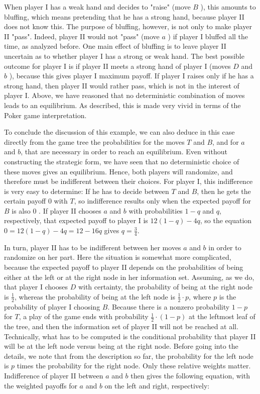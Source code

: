 \documentclass[12pt]{article}
\begin{document}
When player I has a weak hand and decides to "raise" (move $B$ ), this amounts to bluffing, which means pretending that he has a strong hand, because player II does not know this. The purpose of bluffing, however, is not only to make player II "pass". Indeed, player II would not "pass" (move $a$ ) if player I bluffed all the time, as analyzed before. One main effect of bluffing is to leave player II uncertain as to whether player I has a strong or weak hand. The best possible outcome for player I is if player II meets a strong hand of player I (moves $D$ and $b$ ), because this gives player I maximum payoff. If player I raises only if he has a strong hand, then player II would rather pass, which is not in the interest of player I. Above, we have reasoned that no deterministic combination of moves leads to an equilibrium. As described, this is made very vivid in terms of the Poker game interpretation.

To conclude the discussion of this example, we can also deduce in this case directly from the game tree the probabilities for the moves $T$ and $B$, and for $a$ and $b$, that are necessary in order to reach an equilibrium. Even without constructing the strategic form, we have seen that no deterministic choice of these moves gives an equilibrium. Hence, both players will randomize, and therefore must be indifferent between their choices. For player I, this indifference is very easy to determine: If he has to decide between $T$ and $B$, then he gets the certain payoff 0 with $T$, so indifference results only when the expected payoff for $B$ is also 0 . If player II chooses $a$ and $b$ with probabilities $1-q$ and $q$, respectively, that expected payoff to player I is $12(1-q)-4 q$, so the equation $0=12(1-q)-4 q=12-16 q$ gives $q=\frac{3}{4}$.

In turn, player II has to be indifferent between her moves $a$ and $b$ in order to randomize on her part. Here the situation is somewhat more complicated, because the expected payoff to player II depends on the probabilities of being either at the left or at the right node in her information set. Assuming, as we do, that player I chooses $D$ with certainty, the probability of being at the right node is $\frac{1}{2}$, whereas the probability of being at the left node is $\frac{1}{2} \cdot p$, where $p$ is the probability of player I choosing $B$. Because there is a nonzero probability $1-p$ for $T$, a play of the game ends with probability $\frac{1}{2} \cdot(1-p)$ at the leftmost leaf of the tree, and then the information set of player II will not be reached at all. Technically, what has to be computed is the conditional probability that player II will be at the left node versus being at the right node. Before going into the details, we note that from the description so far, the probability for the left node is $p$ times the probability for the right node. Only these relative weights matter. Indifference of player II between $a$ and $b$ then gives the following equation, with the weighted payoffs for $a$ and $b$ on the left and right, respectively:
\end{document}
